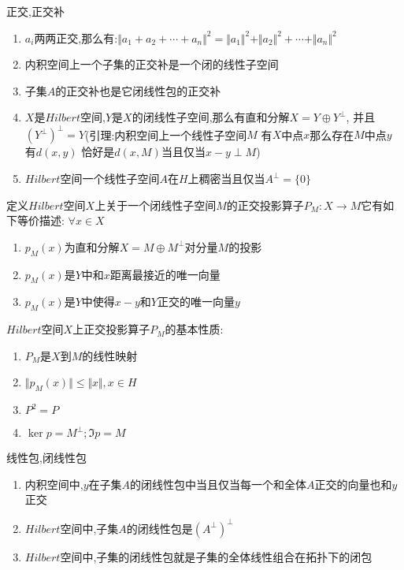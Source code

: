 正交,正交补
\begin{enumerate}
  \item $a_i$两两正交,那么有:$\Vert a_1+a_2+\cdots+a_n\Vert^2=\Vert a_1\Vert^2+\Vert a_2\Vert^2+\cdots+\Vert a_n\Vert^2$
  \item 内积空间上一个子集的正交补是一个闭的线性子空间
  \item 子集$A$的正交补也是它闭线性包的正交补
  \item $X$是$Hilbert$空间,$Y$是$X$的闭线性子空间,那么有直和分解$X=Y\oplus Y^{\perp}$, 并且$\left(Y^ {\perp}\right)^{\perp}=Y$(引理:内积空间上一个线性子空间$M$ 有$X$中点$x$那么存在$M$中点$y$ 有$d(x,y)$ 恰好是$d(x,M)$当且仅当$x-y\perp M$)
  \item $Hilbert$空间一个线性子空间$A$在$H$上稠密当且仅当$A^ {\perp}=\{0\}$
\end{enumerate}

定义$Hilbert$空间$X$上关于一个闭线性子空间$M$的正交投影算子$P_{M}:X\to M$它有如下等价描述: $\forall x\in X$
\begin{enumerate}
  \item $p_M(x)$为直和分解$X=M\oplus M^{\perp}$对分量$M$的投影
  \item $p_M(x)$是$Y$中和$x$距离最接近的唯一向量
  \item $p_M(x)$是$Y$中使得$x-y$和$Y$正交的唯一向量$y$
\end{enumerate}

$Hilbert$空间$X$上正交投影算子$P_M$的基本性质:
\begin{enumerate}
  \item $P_M$是$X$到$M$的线性映射
  \item $\Vert p_M(x)\Vert\le\Vert x\Vert,x\in H$
  \item $P^2=P$
  \item $\ker p=M^{\perp};\Im p=M$
\end{enumerate}

线性包,闭线性包
\begin{enumerate}
  \item 内积空间中,$y$在子集$A$的闭线性包中当且仅当每一个和全体$A$正交的向量也和$y$ 正交
  \item $Hilbert$空间中,子集$A$的闭线性包是$\left(A^ {\perp}\right)^{\perp}$
  \item $Hilbert$空间中,子集的闭线性包就是子集的全体线性组合在拓扑下的闭包
\end{enumerate}

